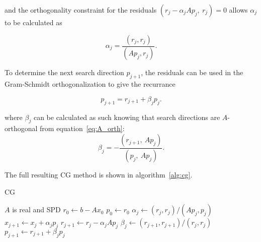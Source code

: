 and the orthogonality constraint for the residuals $\left( r_j - \alpha_j A p_j,\ r_j \right) = 0$  allows $\alpha_j$ to be calculated as

\begin{equation}
    \alpha_j = \frac{\left(r_j, r_j\right)}{\left(Ap_j, r_j\right)}.
\end{equation}

To determine the next search direction $p_{j+1}$, the residuals can be used in the Gram-Schmidt orthogonalization to give the recurrance

\begin{equation}
    p_{j+1} = r_{j+1} + \beta_j p_j.
\end{equation}

where $\beta_j$ can be calculated as such knowing that search directions are $A$-orthogonal from equation~\ref{eq:A_orth}:
\begin{equation}
    \beta_j = - \frac{\left(r_{j+1},\ Ap_j\right)}{\left(p_j,\ Ap_j\right)}.
\end{equation}

The full resulting CG method is shown in algorithm~\ref{alg:cg}.

\begin{algorithm}
	\caption{CG}\label{alg:cg}
	\begin{algorithmic}[1]
        \Require $A$ is real and SPD
            \State $r_0 \gets b - Ax_0$
            \State $p_0 \gets r_0$
                \State $\alpha_j \gets \left(r_j, r_j\right)/\left(Ap_j, p_j\right)$
                \State $x_{j+1} \gets x_j + \alpha_j p_j$
                \State $r_{j+1} \gets r_j - \alpha_j A p_j$
                \State $\beta_j \gets \left(r_{j+1}, r_{j+1}\right)/\left(r_j, r_j\right)$
                \State $p_{j+1} \gets r_{j+1} + \beta_j p_j$
            \EndFor
        \EndProcedure
    \end{algorithmic}
\end{algorithm}



